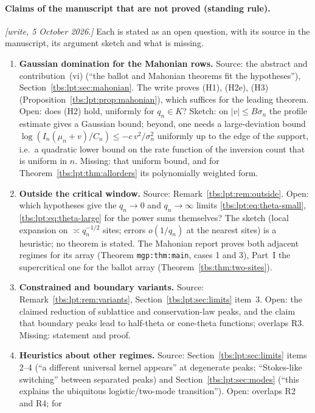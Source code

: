 \documentclass[11pt,a4paper]{article}
\numberwithin{equation}{section}
\theoremstyle{definition}
\newcommand{\code}[1]{\texttt{#1}}
\begin{document}
\paragraph{Claims of the manuscript that are not proved (standing rule).}
\emph{[write, 5 October 2026.]} Each is stated as an open question, with
its source in the manuscript, its argument sketch and what is missing.
\begin{enumerate}[label=\textbf{F\arabic*.},leftmargin=*]
\item \textbf{Gaussian domination for the Mahonian rows.} Source: the
abstract and contribution~(vi) (``the ballot and Mahonian theorems fit
the hypotheses''), Section~\ref{tbs:lpt:sec:mahonian}. The write proves
(H1), (H2e), (H3) (Proposition~\ref{tbs:lpt:prop:mahonian}), which
suffices for the leading theorem. Open: does (H2) hold, uniformly for
$q_n\in K$? Sketch: on $|v|\le B\sigma_n$ the profile estimate gives a
Gaussian bound; beyond, one needs a large-deviation bound
$\log(I_n(\mu_n+v)/C_n)\le-c\,v^2/\sigma_n^2$ uniformly up to the edge of
the support, i.e.\ a quadratic lower bound on the rate function of the
inversion count that is uniform in $n$. Missing: that uniform bound, and
for Theorem~\ref{tbs:lpt:thm:allorders} its polynomially weighted form.
\item \textbf{Outside the critical window.} Source:
Remark~\ref{tbs:lpt:rem:outside}. Open: which hypotheses give the
$q_n\to0$ and $q_n\to\infty$ limits \eqref{tbs:lpt:eq:theta-small},
\eqref{tbs:lpt:eq:theta-large} for the power sums themselves? The sketch
(local expansion on $\asymp q_n^{-1/2}$ sites; errors $o(1/q_n)$ at the
nearest sites) is a heuristic; no theorem is stated. The Mahonian report
proves both adjacent regimes for its array (Theorem \code{mgp:thm:main},
cases 1 and 3), Part~I the supercritical one for the ballot array
(Theorem~\ref{tbs:thm:two-sites}).
\item \textbf{Constrained and boundary variants.} Source:
Remark~\ref{tbs:lpt:rem:variants}, Section~\ref{tbs:lpt:sec:limits}
item~3. Open: the claimed reduction of sublattice and conservation-law
peaks, and the claim that boundary peaks lead to half-theta or cone-theta
functions; overlaps R3. Missing: statement and proof.
\item \textbf{Heuristics about other regimes.} Source:
Section~\ref{tbs:lpt:sec:limits} items 2--4 (``a different universal
kernel appears'' at degenerate peaks; ``Stokes-like switching'' between
separated peaks) and Section~\ref{tbs:lpt:sec:modes} (``this explains the
ubiquitous logistic/two-mode transition''). Open: overlaps R2 and R4; for

\end{enumerate}
\end{document}

